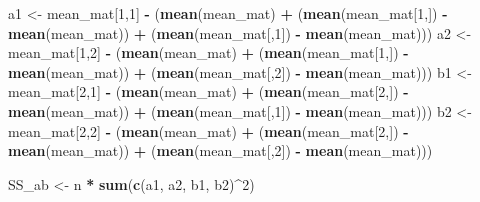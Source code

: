\documentclass[]{book}
\newenvironment{Shaded}{\begin{snugshade}}{\end{snugshade}}
\newcommand{\DecValTok}[1]{\textcolor[rgb]{0.00,0.00,0.81}{#1}}
\newcommand{\KeywordTok}[1]{\textcolor[rgb]{0.13,0.29,0.53}{\textbf{#1}}}
\newcommand{\NormalTok}[1]{#1}
\newcommand{\OperatorTok}[1]{\textcolor[rgb]{0.81,0.36,0.00}{\textbf{#1}}}
\newcommand{\StringTok}[1]{\textcolor[rgb]{0.31,0.60,0.02}{#1}}
\begin{document}
\begin{Shaded}
\begin{Highlighting}[]
\NormalTok{a1 <-}\StringTok{ }\NormalTok{mean_mat[}\DecValTok{1}\NormalTok{,}\DecValTok{1}\NormalTok{] }\OperatorTok{-}\StringTok{ }\NormalTok{(}\KeywordTok{mean}\NormalTok{(mean_mat) }\OperatorTok{+}\StringTok{ }
\StringTok{                         }\NormalTok{(}\KeywordTok{mean}\NormalTok{(mean_mat[}\DecValTok{1}\NormalTok{,]) }\OperatorTok{-}\StringTok{ }\KeywordTok{mean}\NormalTok{(mean_mat)) }\OperatorTok{+}\StringTok{ }
\StringTok{                         }\NormalTok{(}\KeywordTok{mean}\NormalTok{(mean_mat[,}\DecValTok{1}\NormalTok{]) }\OperatorTok{-}\StringTok{ }\KeywordTok{mean}\NormalTok{(mean_mat)))}
\NormalTok{a2 <-}\StringTok{ }\NormalTok{mean_mat[}\DecValTok{1}\NormalTok{,}\DecValTok{2}\NormalTok{] }\OperatorTok{-}\StringTok{ }\NormalTok{(}\KeywordTok{mean}\NormalTok{(mean_mat) }\OperatorTok{+}\StringTok{ }
\StringTok{                         }\NormalTok{(}\KeywordTok{mean}\NormalTok{(mean_mat[}\DecValTok{1}\NormalTok{,]) }\OperatorTok{-}\StringTok{ }\KeywordTok{mean}\NormalTok{(mean_mat)) }\OperatorTok{+}\StringTok{ }
\StringTok{                         }\NormalTok{(}\KeywordTok{mean}\NormalTok{(mean_mat[,}\DecValTok{2}\NormalTok{]) }\OperatorTok{-}\StringTok{ }\KeywordTok{mean}\NormalTok{(mean_mat)))}
\NormalTok{b1 <-}\StringTok{ }\NormalTok{mean_mat[}\DecValTok{2}\NormalTok{,}\DecValTok{1}\NormalTok{] }\OperatorTok{-}\StringTok{ }\NormalTok{(}\KeywordTok{mean}\NormalTok{(mean_mat) }\OperatorTok{+}\StringTok{ }
\StringTok{                         }\NormalTok{(}\KeywordTok{mean}\NormalTok{(mean_mat[}\DecValTok{2}\NormalTok{,]) }\OperatorTok{-}\StringTok{ }\KeywordTok{mean}\NormalTok{(mean_mat)) }\OperatorTok{+}\StringTok{ }
\StringTok{                         }\NormalTok{(}\KeywordTok{mean}\NormalTok{(mean_mat[,}\DecValTok{1}\NormalTok{]) }\OperatorTok{-}\StringTok{ }\KeywordTok{mean}\NormalTok{(mean_mat)))}
\NormalTok{b2 <-}\StringTok{ }\NormalTok{mean_mat[}\DecValTok{2}\NormalTok{,}\DecValTok{2}\NormalTok{] }\OperatorTok{-}\StringTok{ }\NormalTok{(}\KeywordTok{mean}\NormalTok{(mean_mat) }\OperatorTok{+}\StringTok{ }
\StringTok{                         }\NormalTok{(}\KeywordTok{mean}\NormalTok{(mean_mat[}\DecValTok{2}\NormalTok{,]) }\OperatorTok{-}\StringTok{ }\KeywordTok{mean}\NormalTok{(mean_mat)) }\OperatorTok{+}\StringTok{ }
\StringTok{                         }\NormalTok{(}\KeywordTok{mean}\NormalTok{(mean_mat[,}\DecValTok{2}\NormalTok{]) }\OperatorTok{-}\StringTok{ }\KeywordTok{mean}\NormalTok{(mean_mat)))}

\NormalTok{SS_ab <-}\StringTok{ }\NormalTok{n }\OperatorTok{*}\StringTok{ }\KeywordTok{sum}\NormalTok{(}\KeywordTok{c}\NormalTok{(a1, a2, b1, b2)}\OperatorTok{^}\DecValTok{2}\NormalTok{)}
\end{Highlighting}
\end{Shaded}
\end{document}
